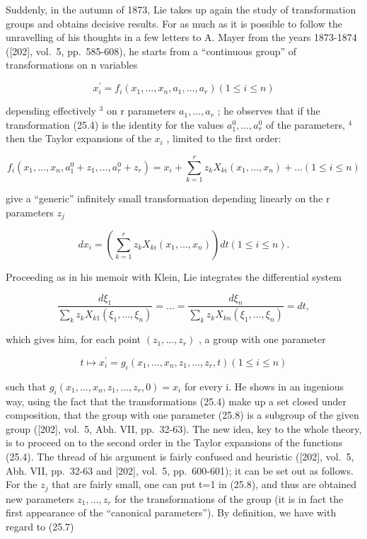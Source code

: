 Suddenly, in the autumn of 1873, Lie takes up again the study of transformation groups and obtains decisive results. For as much as it is possible to follow the unravelling of his thoughts in a few letters to A. Mayer from the years 1873-1874 ({[}202{]}, vol.~5, pp.~585-608), he starts from a ``continuous group'' of transformations on n variables

\[
x _ {i} ^ {\prime} = f _ {i} (x _ {1}, \dots , x _ {n}, a _ {1}, \dots , a _ {r}) (1 \leq i \leq n)\tag{25.4}
\]

depending effectively \(^{3}\) on r parameters \(a_{1},\ldots,a_{r}\) ; he observes that if the transformation (25.4) is the identity for the values \(a_{1}^{0},\ldots,a_{r}^{0}\) of the parameters, \(^{4}\) then the Taylor expansions of the \(x_{i}\) , limited to the first order:

\[
f _ {i} \left(x _ {1}, \dots , x _ {n}, a _ {1} ^ {0} + z _ {1}, \dots , a _ {r} ^ {0} + z _ {r}\right) = x _ {i} + \sum_ {k = 1} ^ {r} z _ {k} X _ {k i} \left(x _ {1}, \dots , x _ {n}\right) + \dots (1 \leq i \leq n)\tag{25.5}
\]

give a ``generic'' infinitely small transformation depending linearly on the r parameters \(z_{j}\)

\[
d x _ {i} = \left(\sum_ {k = 1} ^ {r} z _ {k} X _ {k i} (x _ {1}, \dots , x _ {n})\right) d t (1 \leq i \leq n).\tag{25.6}
\]

Proceeding as in his memoir with Klein, Lie integrates the differential system

\[
\frac {d \xi_ {1}}{\sum_ {k} z _ {k} X _ {k 1} (\xi_ {1} , \dots , \xi_ {n})} = \dots = \frac {d \xi_ {n}}{\sum_ {k} z _ {k} X _ {k n} (\xi_ {1} , \dots , \xi_ {n})} = d t,\tag{25.7}
\]

which gives him, for each point \((z_{1},\ldots,z_{r})\) , a group with one parameter

\[
t \mapsto x _ {i} ^ {\prime} = g _ {i} (x _ {1}, \dots , x _ {n}, z _ {1}, \dots , z _ {r}, t) (1 \leq i \leq n)\tag{25.8}
\]

such that \(g_{i}(x_{1},\ldots,x_{n},z_{1},\ldots,z_{r},0)=x_{i}\) for every i. He shows in an ingenious way, using the fact that the transformations (25.4) make up a set closed under composition, that the group with one parameter (25.8) is a subgroup of the given group ({[}202{]}, vol.~5, Abh. VII, pp.~32-63). The new idea, key to the whole theory, is to proceed on to the second order in the Taylor expansions of the functions (25.4). The thread of his argument is fairly confused and heuristic ({[}202{]}, vol.~5, Abh. VII, pp.~32-63 and {[}202{]}, vol.~5, pp.~600-601); it can be set out as follows. For the \(z_{j}\) that are fairly small, one can put t=1 in (25.8), and thus are obtained new parameters \(z_{1},\ldots,z_{r}\) for the transformations of the group (it is in fact the first appearance of the ``canonical parameters''). By definition, we have with regard to (25.7)

